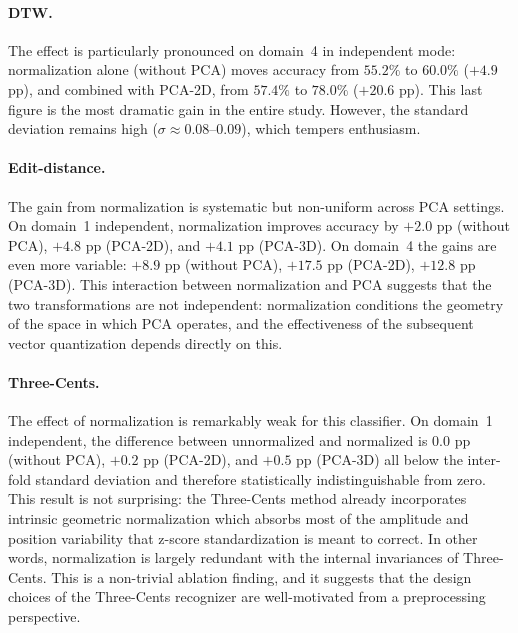 \paragraph{DTW.}
The effect is particularly pronounced on domain~4 in independent mode: normalization
alone (without PCA) moves accuracy from $55.2\%$ to $60.0\%$ ($+4.9$ pp), and combined
with PCA-2D, from $57.4\%$ to $78.0\%$ ($+20.6$ pp). This last figure is the most
dramatic gain in the entire study. However, the standard deviation remains high
($\sigma \approx 0.08$--$0.09$), which tempers enthusiasm.

\paragraph{Edit-distance.}
The gain from normalization is systematic but non-uniform across PCA settings. On
domain~1 independent, normalization improves accuracy by $+2.0$ pp (without PCA),
$+4.8$ pp (PCA-2D), and $+4.1$ pp (PCA-3D). On domain~4 the gains are even more
variable: $+8.9$ pp (without PCA), $+17.5$ pp (PCA-2D), $+12.8$ pp (PCA-3D). This
interaction between normalization and PCA suggests that the two transformations are not
independent: normalization conditions the geometry of the space in which PCA operates,
and the effectiveness of the subsequent vector quantization depends directly on this.

\paragraph{Three-Cents.}
The effect of normalization is remarkably weak for this classifier. On domain~1
independent, the difference between unnormalized and normalized is $0.0$ pp (without PCA),
$+0.2$ pp (PCA-2D), and $+0.5$ pp (PCA-3D) all below the inter-fold standard
deviation and therefore statistically indistinguishable from zero. This result is not
surprising: the Three-Cents method already incorporates
intrinsic geometric normalization which absorbs most of the amplitude and position variability that z-score
standardization is meant to correct. In other words, normalization is largely redundant
with the internal invariances of Three-Cents. This is a non-trivial ablation finding,
and it suggests that the design choices of the Three-Cents recognizer are well-motivated
from a preprocessing perspective.

